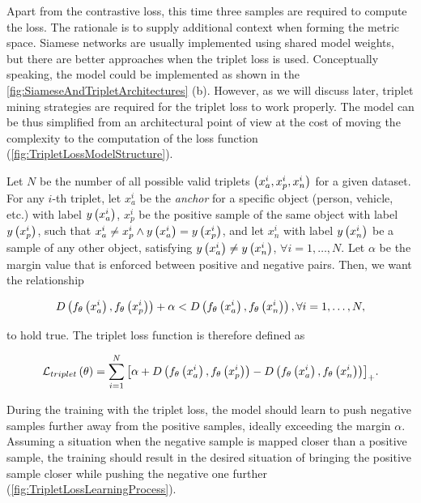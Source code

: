 Apart from the contrastive loss, this time three samples are required to compute the loss. The rationale is to supply additional context when forming the metric space. Siamese networks are usually implemented using shared model weights, but there are better approaches when the triplet loss is used. Conceptually speaking, the model could be implemented as shown in the \cref{fig:SiameseAndTripletArchitectures} (b). However, as we will discuss later, triplet mining strategies are required for the triplet loss to work properly. The model can be thus simplified from an architectural point of view at the cost of moving the complexity to the computation of the loss function (\cref{fig:TripletLossModelStructure}).

Let $N$ be the number of all possible valid triplets $\left( {x_a^i, x_p^i, x_n^i} \right)$ for a given dataset. For any $i$-th triplet, let $x_a^i$ be the \emph{anchor} for a specific object (person, vehicle, etc.) with label ${y} \left( x_a^i \right)$, $x_p^i$ be the positive sample of the same object with label ${y} \left( x_p^i \right)$, such that $x_a^i \neq x_p^i \land {y} \left( x_a^i \right) = {y} \left( x_p^i \right)$, and let $x_n^i$ with label ${y} \left( x_n^i \right)$ be a sample of any other object, satisfying ${y} \left( x_a^i \right) \neq {y} \left( x_n^i \right)$, $\forall i = 1, \dots, N$. Let $\alpha$ be the margin value that is enforced between positive and negative pairs. Then, we want the relationship~\cite{Schroff2015}

\begin{equation}
    \label{eq:TripletDistanceConstraint}
    {D} \left( {f_\theta} \left( x_a^i \right), {f_\theta} \left( x_p^i \right) \right) + \alpha < {D} \left( {f_\theta} \left( x_a^i \right), {f_\theta} \left( x_n^i \right) \right), \forall i = 1, \dots, N,
\end{equation}

\noindent to hold true. The triplet loss function is therefore defined as~\cite{Schroff2015}

\begin{equation}
    \label{eq:TripletLoss}
    {\mathcal{L}_{triplet}} \left( \theta \right) =
    \sum_{i = 1}^{N}
    {\left[ {
        \alpha +
        {D} \left( {f_\theta} \left( x_a^i \right), {f_\theta} \left( x_p^i \right) \right) -
        {D} \left( {f_\theta} \left( x_a^i \right), {f_\theta} \left( x_n^i \right) \right)
    } \right]}_+.
\end{equation}

\noindent During the training with the triplet loss, the model should learn to push negative samples further away from the positive samples, ideally exceeding the margin $\alpha$. Assuming a situation when the negative sample is mapped closer than a positive sample, the training should result in the desired situation of bringing the positive sample closer while pushing the negative one further (\cref{fig:TripletLossLearningProcess}).


